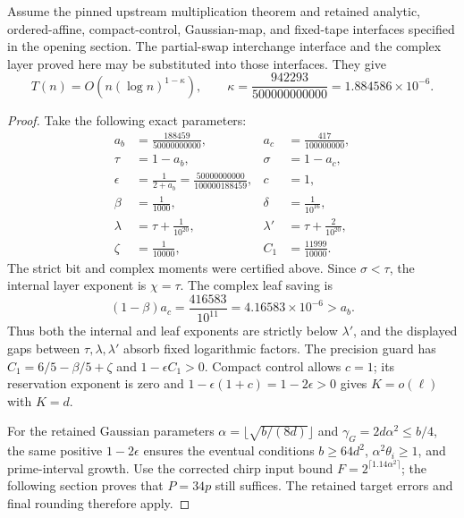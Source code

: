 \begin{theorem}
Assume the pinned upstream multiplication theorem and retained analytic,
ordered-affine, compact-control, Gaussian-map, and fixed-tape interfaces
specified in the opening section. The partial-swap interchange interface
and the complex layer proved here may be substituted into those
interfaces. They give
\[
 T(n)=O\!\left(n(\log n)^{1-\kappa}\right),\qquad
 \boxed{\kappa=\frac{942293}{500000000000}
                 =1.884586\times10^{-6}}.
\]
\end{theorem}
\begin{proof}
Take the following exact parameters:
\[
\begin{aligned}
 a_b&=\frac{188459}{50000000000},&a_c&=\frac{417}{100000000},\\
 \tau&=1-a_b,&\sigma&=1-a_c,\\
 \epsilon&=\frac1{2+a_b}=\frac{50000000000}{100000188459},&c&=1,\\
 \beta&=\frac1{1000},&\delta&=\frac1{10^{16}},\\
 \lambda&=\tau+\frac1{10^{20}},&\lambda'&=\tau+\frac2{10^{20}},\\
 \zeta&=\frac1{10000},&C_1&=\frac{11999}{10000}.
\end{aligned}
\]
The strict bit and complex moments were certified above. Since
$\sigma<\tau$, the internal layer exponent is $\chi=\tau$.
The complex leaf saving is
\[
 (1-\beta)a_c=\frac{416583}{10^{11}}=4.16583\times10^{-6}>a_b.
\]
Thus both the internal and leaf exponents are strictly below
$\lambda'$, and the displayed gaps between $\tau,\lambda,\lambda'$
absorb fixed logarithmic factors. The precision guard has
$C_1=6/5-\beta/5+\zeta$ and $1-\epsilon C_1>0$.
Compact control allows $c=1$; its reservation exponent is zero and
$1-\epsilon(1+c)=1-2\epsilon>0$ gives $K=o(\ell)$ with $K=d$.

For the retained Gaussian parameters
$\alpha=\lfloor\sqrt{b/(8d)}\rfloor$ and
$\gamma_G=2d\alpha^2\le b/4$, the same positive $1-2\epsilon$
ensures the eventual conditions $b\ge64d^2$, $\alpha^2\theta_i\ge1$,
and prime-interval growth. Use the corrected chirp input bound
$F=2^{\lceil1.14\alpha^2\rceil}$; the following section proves that
$P=34p$ still suffices. The retained target errors and final rounding
therefore apply.


\end{proof}
